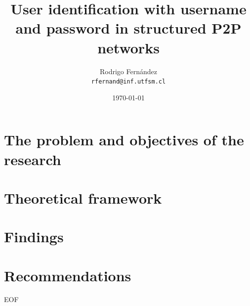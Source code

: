 \documentclass[12pt]{beamer}
\title{User identification with username and password in structured P2P networks}
\subtitle{}
\author[R. Fernández]{Rodrigo Fernández \\ \small{\texttt{rfernand@inf.utfsm.cl}}}
\institute[]{Universidad Técnica Federico Santa María}
\date{\today}
\begin{document}

  \frame{\titlepage}
  \frame{\tableofcontents}
  \section{The problem and objectives of the research}
  
  \label{sec:goals}
  \section{Theoretical framework}
  
  \label{sec:soa}
  
  \section{Findings}
  \label{sec:findings}
  
  \section{Recommendations}
  \label{sec:recommendations}
  
\frame
{
	\vspace{2cm}
	\begin{center}
		\Large{EOF}
	\end{center}
}
\end{document}
